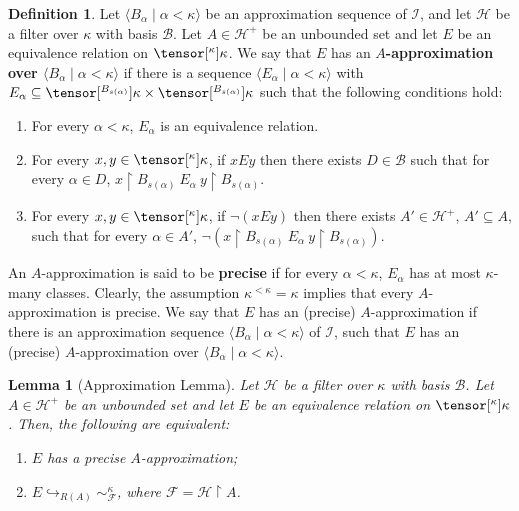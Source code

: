 \documentclass{amsart}
\numberwithin{equation}{section}
\newcommand{\pre}[2]{\tensor[^{#1}]{#2}{}}
\newcommand{\seq}[2]{\langle #1 \mid #2 \rangle}
\newcommand{\markdef}[1]{\textbf{#1}}
\newcommand{\1}{\mathbf{I}}
\newcommand{\2}{\mathbf{II}}
\renewcommand{\k}{\kappa}
\newtheorem{lemma}[theorem]{Lemma}
\theoremstyle{definition}
\newtheorem{definition}[theorem]{Definition}
\theoremstyle{remark}
\begin{document}
\begin{definition}\label{A-approximationk}
    Let \(\seq{B_\alpha}{\alpha<\kappa}\) be an approximation sequence of $\mathcal{I}$, and let  $\mathcal{H}$ be a filter over $\kappa$ with basis $\mathcal{B}$. Let $A\in \mathcal{H}^+$ be an unbounded set and let $E$ be an equivalence relation on $\pre{\k}{\kappa}$.
    We say that $E$ has an \markdef{$A$-approximation over $\seq{B_\alpha}{\alpha<\kappa}$} if there is  a sequence $\langle E_\alpha\mid \alpha<\kappa\rangle$ with $E_\alpha\subseteq \pre{B_{s(\alpha)}}{\k}\times \pre{B_{s(\alpha)}}{\k}$ such that the following conditions hold:
    \begin{enumerate}[label={\upshape (\arabic*)}, leftmargin=2pc]
        \item For every $ \alpha<\kappa$, $E_\alpha$ is an equivalence relation.
        \item\label{A-approximationk_2} For every $x,y\in \pre{\k}{\kappa}$, if $x E y$ then there exists $D\in \mathcal{B}$ such that for every $\alpha\in D$, $x\restriction B_{s(\alpha)} \ E_\alpha\ y\restriction B_{s(\alpha)}$.
        \item\label{A-approximationk_3} For every $x,y\in \pre{\k}{\kappa}$, if $\neg (x E y)$ then there exists $A'\in \mathcal{H}^+$, $A'\subseteq A$, such that for every $\alpha\in A'$, $\neg(x\restriction B_{s(\alpha)} \ E_\alpha\ y\restriction B_{s(\alpha)})$.
    \end{enumerate}
\end{definition}
An $A$-approximation is said to be \markdef{precise} if for every $\alpha<\kappa$, $E_\alpha$ has at most $\kappa$-many classes. Clearly, the assumption $\k^{<\k}=\k$ implies that every $A$-approximation is precise.
We say that $E$ has an (precise) $A$-approximation if there is an approximation sequence $\seq{B_\alpha}{\alpha<\kappa}$ of $\mathcal{I}$, such that $E$ has an (precise) $A$-approximation over $\seq{B_\alpha}{\alpha<\kappa}$.



\begin{lemma}[Approximation Lemma]\label{approx_lemma}
    Let $\mathcal{H}$ be a filter over $\kappa$ with basis $\mathcal{B}$. Let $A\in \mathcal{H}^+$ be an unbounded set and let $E$ be an equivalence relation on $\pre{\k}{\kappa}$. Then, the following are equivalent:
    \begin{enumerate}[label={\upshape (\arabic*)}, leftmargin=2pc]
        \item\label{approx1} $E$ has a precise $A$-approximation;
        \item\label{approx2} $E\hookrightarrow_{R(A)}\sim^\kappa_\mathcal{F}$, where $\mathcal{F}=\mathcal{H}\restriction A$.
\end{enumerate}
\end{lemma}
\end{document}
